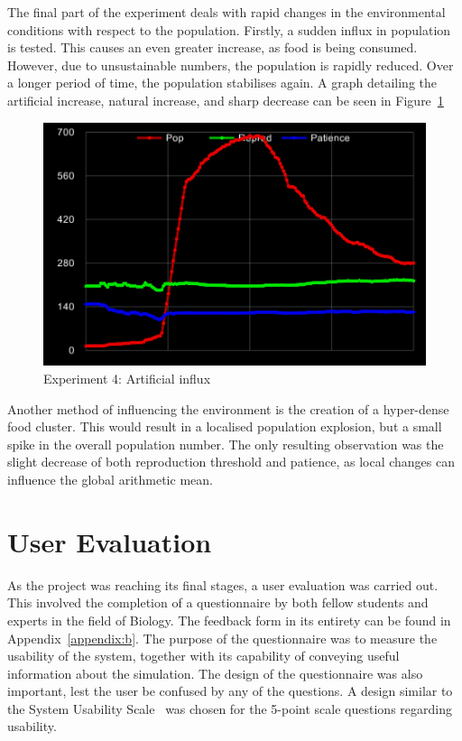The final part of the experiment deals with rapid changes in the environmental conditions with respect to the population. Firstly, a sudden influx in population is tested. This causes an even greater increase, as food is being consumed. However, due to unsustainable numbers, the population is rapidly reduced. Over a longer period of time, the population stabilises again. A graph detailing the artificial increase, natural increase, and sharp decrease can be seen in Figure~\ref{fig:exp4}

\begin{figure}[!th]
	\centering
	\includegraphics[scale=1.4]{images/exp4}
	\caption{\label{fig:exp4}Experiment 4: Artificial influx}
\end{figure}

Another method of influencing the environment is the creation of a hyper-dense food cluster. This would result in a localised population explosion, but a small spike in the overall population number. The only resulting observation was the slight decrease of both reproduction threshold and patience, as local changes can influence the global arithmetic mean.

\section{User Evaluation} \label{usereval}
As the project was reaching its final stages, a user evaluation was carried out. This involved the completion of a questionnaire by both fellow students and experts in the field of Biology. The feedback form in its entirety can be found in Appendix~\ref{appendix:b}. The purpose of the questionnaire was to measure the usability of the system, together with its capability of conveying useful information about the simulation. The design of the questionnaire was also important, lest the user be confused by any of the questions. A design similar to the System Usability Scale~\cite{lewis2009factor} was chosen for the 5-point scale questions regarding usability.

